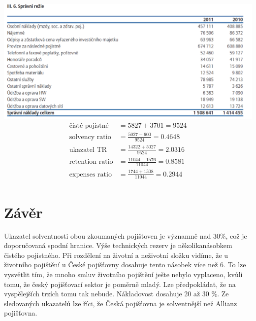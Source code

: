 \documentclass[12pt,oneside]{fithesis}
\begin{document}
\includegraphics[width=1.0\textwidth]{al-nakl2.png}
\begin{align*}
	\text{čisté pojistné}&=5827+3701=9524\\
	\text{solvency ratio}&=\frac{5027-600}{9524}=0.4648\\
	\text{ukazatel TR}&=\frac{14322+5027}{9524}=2.0316\\
	\text{retention ratio}&=\frac{11044-1576}{11044}=0.8581\\
	\text{expenses ratio}&=\frac{1744+1508}{11044}=0.2944\\
\end{align*}
\section{Závěr}
Ukazatel solventnosti obou zkoumaných pojišťoven je významně nad 30\%, což je doporučovaná spodní hranice. Výše technických rezerv je několikanásobkem čistého pojistného. Při rozdělení na životní a neživotní složku vidíme, že u životního pojištění u České pojišťovny dosahuje tento násobek více než 6. To lze vysvětlit tím, že mnoho smluv životního pojištění ješte nebylo vyplaceno, kvůli tomu, že český pojišťovací sektor je poměrně mladý. Lze předpokládat, že na vyspělejších trzích tomu tak nebude. Nákladovost dosahuje 20 až 30 \%. Ze sledovaných ukazatelů lze říci, že Česká pojišťovna je solventnější než Allianz pojišťovna.
\end{document}
